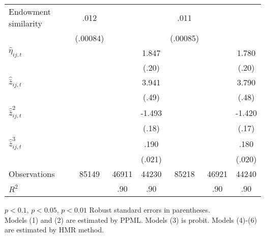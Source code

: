\begin{table}
\begin{threeparttable}
\begin{tabular}{l*{6}{c}}
Endowment similarity&        .012\sym{**}&                    &                    &        .011\sym{**}&                    &                    \\
                    &    (.00084)        &                    &                    &    (.00085)        &                    &                    \\
$\hat{\eta}_{ij,t}$ &                    &                    &       1.847\sym{**}&                    &                    &       1.780\sym{**}\\
                    &                    &                    &       (.20)        &                    &                    &       (.20)        \\
$\hat{\bar{z}}_{ij,t}$&                    &                    &       3.941\sym{**}&                    &                    &       3.790\sym{**}\\
                    &                    &                    &       (.49)        &                    &                    &       (.48)        \\
$\hat{\bar{z}}_{ij,t}^{2}$&                    &                    &      -1.493\sym{**}&                    &                    &      -1.420\sym{**}\\
                    &                    &                    &       (.18)        &                    &                    &       (.17)        \\
$\hat{\bar{z}}_{ij,t}^{3}$&                    &                    &        .190\sym{**}&                    &                    &        .180\sym{**}\\
                    &                    &                    &      (.021)        &                    &                    &      (.020)        \\
\midrule
Observations        &       85149        &       46911        &       44230        &       85218        &       46921        &       44240        \\
\(R^{2}\)           &                    &         .90        &         .90        &                    &         .90        &         .90        \\
\bottomrule \end{tabular}         \begin{tablenotes}                 \small \item \sym{+} \(p<0.1\), \sym{*} \(p<0.05\), \sym{**} \(p<0.01\) Robust standard errors in parentheses. \\                 Models (1) and (2) are estimated by PPML. Models (3) is probit. Models (4)-(6) are estimated by HMR method.                 \end{tablenotes}  \end{threeparttable} \end{table} 
